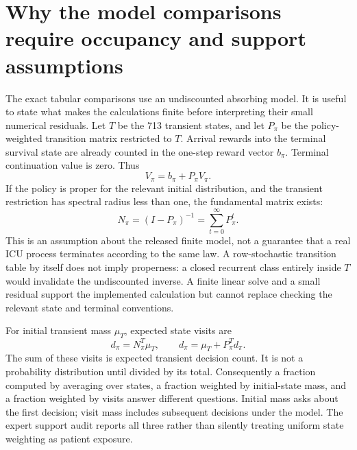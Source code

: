\section{Why the model comparisons require occupancy and support assumptions}
The exact tabular comparisons use an undiscounted absorbing model. It is useful to state what makes the calculations finite before interpreting their small numerical residuals. Let $T$ be the 713 transient states, and let $P_\pi$ be the policy-weighted transition matrix restricted to $T$. Arrival rewards into the terminal survival state are already counted in the one-step reward vector $b_\pi$. Terminal continuation value is zero. Thus
\begin{equation}
V_\pi=b_\pi+P_\pi V_\pi.
\end{equation}
If the policy is proper for the relevant initial distribution, and the transient restriction has spectral radius less than one, the fundamental matrix exists:
\begin{equation}
N_\pi=(I-P_\pi)^{-1}=\sum_{t=0}^{\infty}P_\pi^t.
\end{equation}
This is an assumption about the released finite model, not a guarantee that a real ICU process terminates according to the same law. A row-stochastic transition table by itself does not imply properness: a closed recurrent class entirely inside $T$ would invalidate the undiscounted inverse. A finite linear solve and a small residual support the implemented calculation but cannot replace checking the relevant state and terminal conventions.

For initial transient mass $\mu_T$, expected state visits are
\begin{equation}
d_\pi=N_\pi^T\mu_T,
\qquad d_\pi=\mu_T+P_\pi^T d_\pi.
\end{equation}
The sum of these visits is expected transient decision count. It is not a probability distribution until divided by its total. Consequently a fraction computed by averaging over states, a fraction weighted by initial-state mass, and a fraction weighted by visits answer different questions. Initial mass asks about the first decision; visit mass includes subsequent decisions under the model. The expert support audit reports all three rather than silently treating uniform state weighting as patient exposure.

